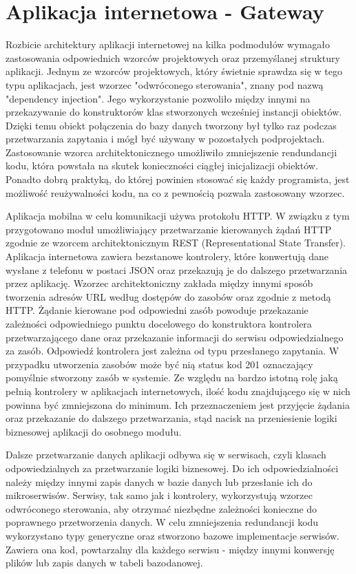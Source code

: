 	
\section{Aplikacja internetowa - Gateway}	
{	Rozbicie architektury aplikacji internetowej na kilka podmodułów wymagało zastosowania odpowiednich wzorców projektowych oraz przemyślanej struktury aplikacji. Jednym ze wzorców projektowych, który świetnie sprawdza się w tego typu aplikacjach, jest wzorzec "odwróconego sterowania", znany pod nazwą "dependency injection". Jego wykorzystanie pozwoliło między innymi na przekazywanie do konstruktorów klas stworzonych wcześniej instancji obiektów. Dzięki temu obiekt połączenia do bazy danych tworzony był tylko raz podczas przetwarzania zapytania i mógł być używany w pozostałych podprojektach. Zastosowanie wzorca architektonicznego umożliwiło zmniejszenie rendundancji kodu, która powstała na skutek konieczności ciągłej inicjalizacji obiektów. Ponadto dobrą praktyką, do której powinien stosować się każdy programista, jest możliwość reużywalności kodu, na co z pewnością pozwala zastosowany wzorzec. 

Aplikacja mobilna w celu komunikacji używa protokołu HTTP. W związku z tym 	 przygotowano moduł umożliwiający przetwarzanie kierowanych żądań HTTP zgodnie ze wzorcem architektonicznym REST (Representational State Transfer). Aplikacja internetowa zawiera bezstanowe kontrolery, które konwertują dane wysłane z telefonu w postaci JSON oraz przekazują je do dalszego przetwarzania przez aplikację. Wzorzec architektoniczny zakłada między innymi sposób tworzenia adresów URL według dostępów do zasobów oraz zgodnie z metodą HTTP. Żądanie kierowane pod odpowiedni zasób powoduje przekazanie zależności odpowiedniego punktu docelowego do konstruktora kontrolera przetwarzającego dane oraz przekazanie informacji do serwisu odpowiedzialnego za zasób. Odpowiedź kontrolera jest zależna od typu przesłanego zapytania. W przypadku utworzenia zasobów może być nią status kod 201 oznaczający pomyślnie stworzony zasób w systemie. Ze względu na bardzo istotną rolę jaką pełnią kontrolery w aplikacjach internetowych, ilość kodu znajdującego się w nich powinna być zmniejszona do minimum. Ich przeznaczeniem jest przyjęcie żądania oraz przekazanie do dalszego przetwarzania, stąd nacisk na przeniesienie logiki biznesowej aplikacji do osobnego modułu.

Dalsze przetwarzanie danych aplikacji odbywa się w serwisach, czyli klasach odpowiedzialnych za przetwarzanie logiki biznesowej. Do ich odpowiedzialności należy między innymi zapis danych w bazie danych lub przesłanie ich do mikroserwisów. Serwisy, tak samo jak i kontrolery, wykorzystują wzorzec odwróconego sterowania, aby otrzymać niezbędne zależności konieczne do poprawnego przetworzenia danych. W celu zmniejszenia redundancji kodu wykorzystano typy generyczne oraz stworzono bazowe implementacje serwisów. Zawiera ona kod, powtarzalny dla każdego serwisu - między innymi konwersję plików lub zapis danych w tabeli bazodanowej. 

}
